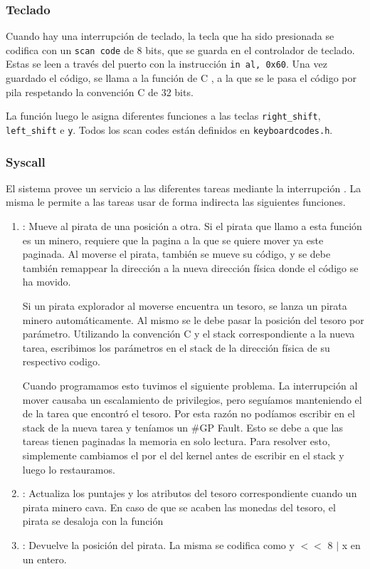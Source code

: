 \subsubsection{Teclado}

Cuando hay una interrupción de teclado, la tecla que ha sido presionada se codifica con un \texttt{scan code} de 8 bits, que se guarda en el controlador de teclado. Estas se leen a través del puerto  con la instrucción \texttt{in al, 0x60}. Una vez guardado el código, se llama a la función de C , a la que se le pasa el código por pila respetando la convención C de 32 bits.

La función  luego le asigna diferentes funciones a las teclas \texttt{right\_shift}, \texttt{left\_shift} e \texttt{y}. Todos los scan codes están definidos en \texttt{keyboardcodes.h}.

\subsubsection{Syscall}
El sistema provee un servicio a las diferentes tareas mediante la interrupción . La misma le permite a las tareas usar de forma indirecta las siguientes funciones.
\begin{enumerate}
\item {}: Mueve al pirata de una posición a otra. Si el pirata que llamo a esta función es un minero, requiere que la pagina a la que  se quiere mover ya este paginada. Al moverse el pirata, también se mueve su código, y se debe también remappear la dirección  a la nueva dirección física donde el código se ha movido.

Si un pirata explorador al moverse encuentra un tesoro, se lanza un pirata minero automáticamente. Al mismo se le debe pasar la posición del tesoro por parámetro. Utilizando la convención C y el stack correspondiente a la nueva tarea, escribimos los parámetros en el stack de la dirección física de su respectivo codigo.

Cuando programamos esto tuvimos el siguiente problema. La interrupción al mover causaba un escalamiento de privilegios, pero seguíamos manteniendo el  de la tarea que encontró el tesoro. Por esta razón no podíamos escribir en el stack de la nueva tarea y teníamos un \#GP Fault. Esto se debe a que las tareas tienen paginadas la memoria en solo lectura. Para resolver esto, simplemente cambiamos el  por el del kernel antes de escribir en el stack y luego lo restauramos.

\item {}: Actualiza los puntajes y los atributos del tesoro correspondiente cuando un pirata minero cava. En caso de que se acaben las monedas del tesoro, el pirata se desaloja con la función 
\item {}: Devuelve la posición del pirata. La misma se codifica como y $<<$ 8 $|$ x en un entero.
\end{enumerate}


